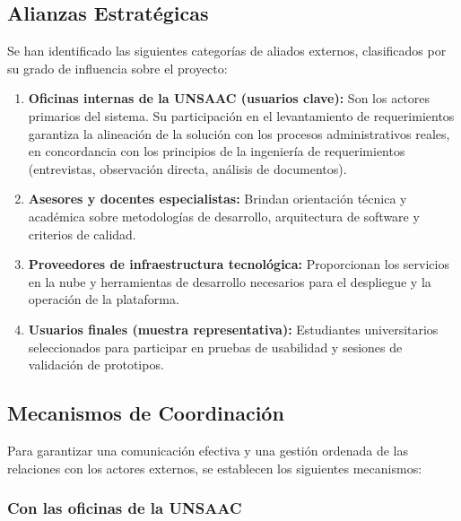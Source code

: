 \subsection{Alianzas Estratégicas}

Se han identificado las siguientes categorías de aliados externos, clasificados por su grado
de influencia sobre el proyecto:

\begin{enumerate}[label=\textbf{\Roman*.}]
    \item \textbf{Oficinas internas de la UNSAAC (usuarios clave):} Son los actores primarios del
        sistema. Su participación en el levantamiento de requerimientos garantiza la alineación de
        la solución con los procesos administrativos reales, en concordancia con los principios de
        la ingeniería de requerimientos (entrevistas, observación directa, análisis de documentos).

    \item \textbf{Asesores y docentes especialistas:} Brindan orientación técnica y académica
        sobre metodologías de desarrollo, arquitectura de software y criterios de calidad.

    \item \textbf{Proveedores de infraestructura tecnológica:} Proporcionan los servicios en la
        nube y herramientas de desarrollo necesarios para el despliegue y la operación de la
        plataforma.

    \item \textbf{Usuarios finales (muestra representativa):} Estudiantes universitarios
        seleccionados para participar en pruebas de usabilidad y sesiones de validación de
        prototipos.
\end{enumerate}

\subsection{Mecanismos de Coordinación}

Para garantizar una comunicación efectiva y una gestión ordenada de las relaciones con los
actores externos, se establecen los siguientes mecanismos:

\subsubsection{Con las oficinas de la UNSAAC}


